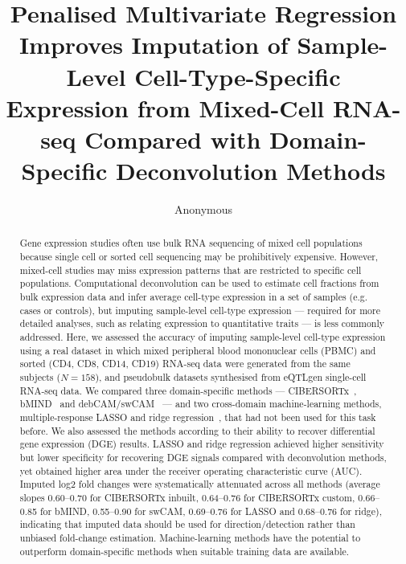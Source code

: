 \documentclass[11pt]{article}
\title{Penalised Multivariate Regression Improves Imputation of Sample-Level Cell-Type-Specific Expression from Mixed-Cell RNA-seq Compared with Domain-Specific Deconvolution Methods}
\author{Anonymous}
\date{}
\begin{document}
\maketitle

\begin{abstract}
Gene expression studies often use bulk RNA sequencing of mixed cell populations because single cell or sorted cell sequencing may be prohibitively expensive. However, mixed-cell studies may miss expression patterns that are restricted to specific cell populations. Computational deconvolution can be used to estimate cell fractions from bulk expression data and infer average cell-type expression in a set of samples (e.g. cases or controls), but imputing sample-level cell-type expression --- required for more detailed analyses, such as relating expression to quantitative traits --- is less commonly addressed. Here, we assessed the accuracy of imputing sample-level cell-type expression using a real dataset in which mixed peripheral blood mononuclear cells (PBMC) and sorted (CD4, CD8, CD14, CD19) RNA-seq data were generated from the same subjects ($N=158$), and pseudobulk datasets synthesised from eQTLgen single-cell RNA-seq data. We compared three domain-specific methods --- CIBERSORTx~\citep{newman2019cibersortx}, bMIND~\citep{wang2021bmind} and debCAM/swCAM~\citep{chen2022swcam,wang2016debcam} --- and two cross-domain machine-learning methods, multiple-response LASSO and ridge regression~\citep{tibshirani1996lasso,hoerl1970ridge,friedman2010glmnet}, that had not been used for this task before. We also assessed the methods according to their ability to recover differential gene expression (DGE) results. LASSO and ridge regression achieved higher sensitivity but lower specificity for recovering DGE signals compared with deconvolution methods, yet obtained higher area under the receiver operating characteristic curve (AUC). Imputed log2 fold changes were systematically attenuated across all methods (average slopes 0.60--0.70 for CIBERSORTx inbuilt, 0.64--0.76 for CIBERSORTx custom, 0.66--0.85 for bMIND, 0.55--0.90 for swCAM, 0.69--0.76 for LASSO and 0.68--0.76 for ridge), indicating that imputed data should be used for direction/detection rather than unbiased fold-change estimation. Machine-learning methods have the potential to outperform domain-specific methods when suitable training data are available.
\end{abstract}
\end{document}
